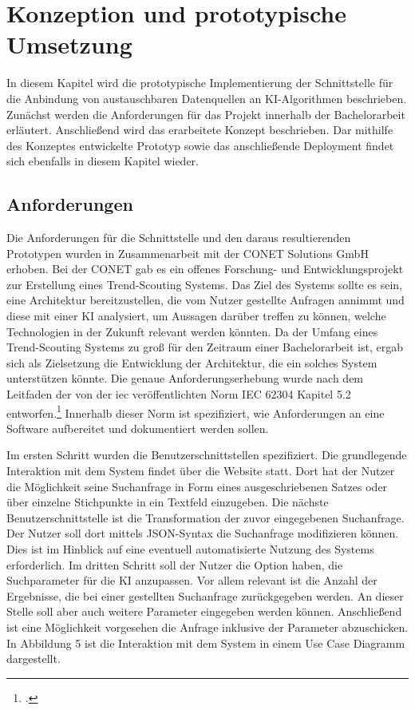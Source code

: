 \section{Konzeption und prototypische Umsetzung}
In diesem Kapitel wird die prototypische Implementierung der Schnittstelle für die Anbindung von austauschbaren Datenquellen an KI-Algorithmen beschrieben. Zunächst werden die Anforderungen für das Projekt innerhalb der Bachelorarbeit erläutert. Anschließend wird das erarbeitete Konzept beschrieben. Dar mithilfe des Konzeptes entwickelte Prototyp sowie das anschließende Deployment findet sich ebenfalls in diesem Kapitel wieder.  

\subsection{Anforderungen}
Die Anforderungen für die Schnittstelle und den daraus resultierenden Prototypen wurden in Zusammenarbeit mit der CONET Solutions GmbH erhoben. Bei der CONET gab es ein offenes Forschung- und Entwicklungsprojekt zur Erstellung eines Trend-Scouting Systems. Das Ziel des Systems sollte es sein, eine Architektur bereitzustellen, die vom Nutzer gestellte Anfragen annimmt und diese mit einer KI analysiert, um Aussagen darüber treffen zu können, welche Technologien in der Zukunft relevant werden könnten. Da der Umfang eines Trend-Scouting Systems zu groß für den Zeitraum einer Bachelorarbeit ist, ergab sich als Zielsetzung die Entwicklung der Architektur, die ein solches System unterstützen könnte. Die genaue Anforderungserhebung wurde nach dem Leitfaden der von der \ac{iec} veröffentlichten Norm IEC 62304 Kapitel 5.2 entworfen.\footcite{daniel2018anforderungen} Innerhalb dieser Norm ist spezifiziert, wie Anforderungen an eine Software aufbereitet und dokumentiert werden sollen.

Im ersten Schritt wurden die Benutzerschnittstellen spezifiziert. Die grundlegende Interaktion mit dem System findet über die Website statt. Dort hat der Nutzer die Möglichkeit seine Suchanfrage in Form eines ausgeschriebenen Satzes oder über einzelne Stichpunkte in ein Textfeld einzugeben. Die nächste Benutzerschnittstelle ist die Transformation der zuvor eingegebenen Suchanfrage. Der Nutzer soll dort mittels JSON-Syntax die Suchanfrage modifizieren können. Dies ist im Hinblick auf eine eventuell automatisierte Nutzung des Systems erforderlich. Im dritten Schritt soll der Nutzer die Option haben, die Suchparameter für die KI anzupassen. Vor allem relevant ist die Anzahl der Ergebnisse, die bei einer gestellten Suchanfrage zurückgegeben werden. An dieser Stelle soll aber auch weitere Parameter eingegeben werden können. Anschließend ist eine Möglichkeit vorgesehen die Anfrage inklusive der Parameter abzuschicken. In Abbildung 5 ist die Interaktion mit dem System in einem Use Case Diagramm dargestellt.


